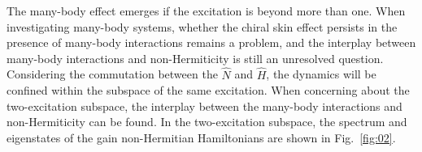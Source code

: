 \documentclass[longbibliography, aps, prx, amsmath, amssymb, amsfonts, twocolumn,superscriptaddress, footinbib]{revtex4-1}
\begin{document}

	
	The many-body effect emerges if the excitation is beyond more than one. 
	When investigating many-body systems, whether the chiral skin effect persists in the presence of many-body interactions remains a problem, and the interplay between many-body interactions and non-Hermiticity is still an unresolved question. 
	Considering the commutation between the $\hat{N}$ and $\hat{H}$, the dynamics will be confined within the subspace of the same excitation. When concerning about the two-excitation subspace, the interplay between the many-body interactions and non-Hermiticity can be found. 
	In the two-excitation subspace, the spectrum and eigenstates of the gain non-Hermitian Hamiltonians 
	are shown in Fig.~\ref{fig:02}.
\end{document}
